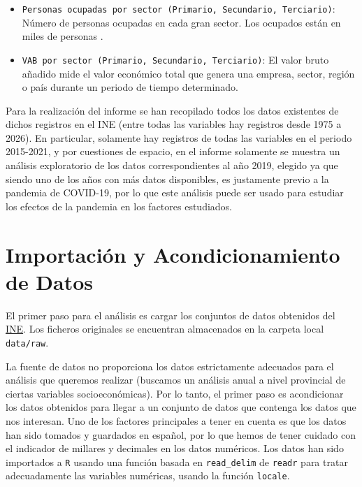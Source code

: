 \documentclass[data,article,submit,moreauthors,pdftex]{Definitions/mdpi}
\providecommand{\tightlist}{%
  \setlength{\itemsep}{0pt}\setlength{\parskip}{0pt}}
\begin{document}
\begin{itemize}
\tightlist
\item
  \texttt{Personas\ ocupadas\ por\ sector\ (Primario,\ Secundario,\ Terciario)}:
  Número de personas ocupadas en cada gran sector. Los ocupados están en
  miles de personas .
\item
  \texttt{VAB\ por\ sector\ (Primario,\ Secundario,\ Terciario)}: El
  valor bruto añadido mide el valor económico total que genera una
  empresa, sector, región o país durante un periodo de tiempo
  determinado.
\end{itemize}

Para la realización del informe se han recopilado todos los datos
existentes de dichos registros en el INE (entre todas las variables hay
registros desde 1975 a 2026). En particular, solamente hay registros de
todas las variables en el periodo 2015-2021, y por cuestiones de
espacio, en el informe solamente se muestra un análisis exploratorio de
los datos correspondientes al año 2019, elegido ya que siendo uno de los
años con más datos disponibles, es justamente previo a la pandemia de
COVID-19, por lo que este análisis puede ser usado para estudiar los
efectos de la pandemia en los factores estudiados.

\section{Importación y Acondicionamiento de
Datos}\label{importaciuxf3n-y-acondicionamiento-de-datos}

El primer paso para el análisis es cargar los conjuntos de datos
obtenidos del
\href{https://ine.es/dyngs/INEbase/listaoperaciones.htm}{INE}. Los
ficheros originales se encuentran almacenados en la carpeta local
\texttt{data/raw}.

La fuente de datos no proporciona los datos estrictamente adecuados para
el análisis que queremos realizar (buscamos un análisis anual a nivel
provincial de ciertas variables socioeconómicas). Por lo tanto, el
primer paso es acondicionar los datos obtenidos para llegar a un
conjunto de datos que contenga los datos que nos interesan. Uno de los
factores principales a tener en cuenta es que los datos han sido tomados
y guardados en español, por lo que hemos de tener cuidado con el
indicador de millares y decimales en los datos numéricos. Los datos han
sido importados a \texttt{R} usando una función basada en
\texttt{read\_delim} de \texttt{readr} para tratar adecuadamente las
variables numéricas, usando la función \texttt{locale}.
\end{document}
